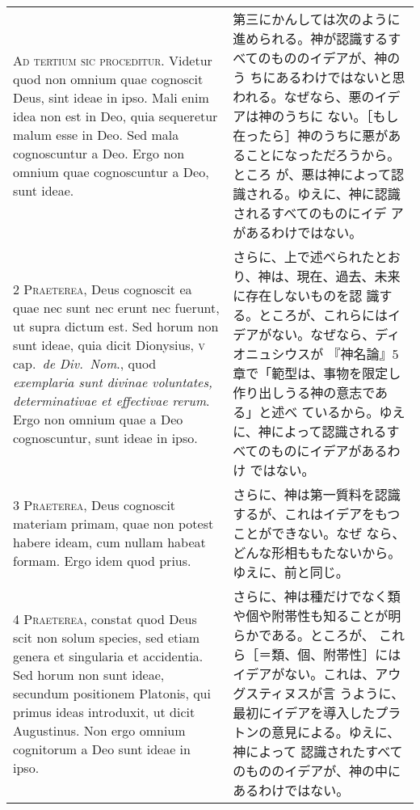 \documentclass[10pt]{jsarticle} %
\begin{document}
\begin{longtable}{p{21em}p{21em}}

{\huge A}{\scshape d tertium sic proceditur}. Videtur quod non
omnium quae cognoscit Deus, sint ideae in ipso. Mali enim idea non est
in Deo, quia sequeretur malum esse in Deo. Sed mala cognoscuntur a
Deo. Ergo non omnium quae cognoscuntur a Deo, sunt ideae.


&

第三にかんしては次のように進められる。神が認識するすべてのもののイデアが、神のう
 ちにあるわけではないと思われる。なぜなら、悪のイデアは神のうちに
 ない。［もし在ったら］神のうちに悪があることになっただろうから。ところ
 が、悪は神によって認識される。ゆえに、神に認識されるすべてのものにイデ
 アがあるわけではない。

\\


{\scshape 2 Praeterea}, Deus cognoscit ea quae nec sunt nec erunt nec
fuerunt, ut supra dictum est. Sed horum non sunt ideae, quia dicit
Dionysius, {\scshape v} cap.~{\itshape de Div.~Nom}., quod {\itshape
exemplaria sunt divinae voluntates, determinativae et effectivae
rerum}. Ergo non omnium quae a Deo cognoscuntur, sunt ideae in ipso.


&

さらに、上で述べられたとおり、神は、現在、過去、未来に存在しないものを認
 識する。ところが、これらにはイデアがない。なぜなら、ディオニュシウスが
 『神名論』5章で「範型は、事物を限定し作り出しうる神の意志である」と述べ
 ているから。ゆえに、神によって認識されるすべてのものにイデアがあるわけ
 ではない。

\\


{\scshape 3 Praeterea}, Deus cognoscit materiam primam,
quae non potest habere ideam, cum nullam habeat formam. Ergo idem quod
prius.


&

さらに、神は第一質料を認識するが、これはイデアをもつことができない。なぜ
 なら、どんな形相ももたないから。ゆえに、前と同じ。

\\


{\scshape 4 Praeterea}, constat quod Deus scit non solum
species, sed etiam genera et singularia et accidentia. Sed horum non
sunt ideae, secundum positionem Platonis, qui primus ideas introduxit,
ut dicit Augustinus. Non ergo omnium cognitorum a Deo sunt ideae in
ipso.

&

さらに、神は種だけでなく類や個や附帯性も知ることが明らかである。ところが、
 これら［＝類、個、附帯性］にはイデアがない。これは、アウグスティヌスが言
 うように、最初にイデアを導入したプラトンの意見による。ゆえに、神によって
 認識されたすべてのもののイデアが、神の中にあるわけではない。


\end{longtable}
\end{document}
